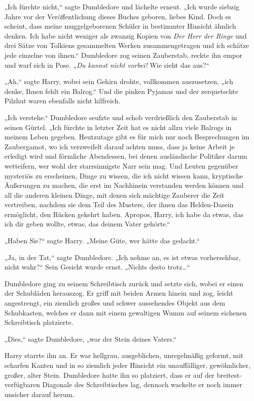 {„Ich fürchte nicht,“ sagte Dumbledore und lächelte erneut. „Ich wurde siebzig Jahre vor der Veröffentlichung dieses Buches geboren, liebes Kind. Doch es scheint, dass meine muggelgeborenen Schüler in bestimmter Hinsicht ähnlich denken. Ich habe nicht weniger als zwanzig Kopien von \emph{Der Herr der Ringe} und drei Sätze von Tolkiens gesammelten Werken zusammengetragen und ich schätze jede einzelne von ihnen.“ Dumbledore zog seinen Zauberstab, reckte ihn empor und warf sich in Pose. „\emph{Du kannst nicht vorbei!} Wie sieht das aus?“

„Ah,“ sagte Harry, wobei sein Gehirn drohte, vollkommen auszusetzen, „ich denke, Ihnen fehlt ein Balrog.“ Und die pinken Pyjamas und der zerquetschte Pilzhut waren ebenfalls nicht hilfreich.

„Ich verstehe.“ Dumbledore seufzte und schob verdrießlich den Zauberstab in seinen Gürtel. „Ich fürchte in letzter Zeit hat es nicht allzu viele Balrogs in meinem Leben gegeben. Heutzutage gibt es für mich nur noch Besprechungen im Zaubergamot, wo ich verzweifelt darauf achten muss, dass ja keine Arbeit je erledigt wird und förmliche Abendessen, bei denen ausländische Politiker darum wetteifern, wer wohl der starrsinnigste Narr sein mag. Und Leuten gegenüber mysteriös zu erscheinen, Dinge zu wissen, die ich nicht wissen kann, kryptische Äußerungen zu machen, die erst im Nachhinein verstanden werden können und all die anderen kleinen Dinge, mit denen sich mächtige Zauberer die Zeit vertreiben, nachdem sie dem Teil des Musters, der ihnen das Helden-Dasein ermöglicht, den Rücken gekehrt haben. Apropos, Harry, ich habe da etwas, das ich dir geben wollte, etwas, das deinem Vater gehörte.“

„Haben Sie?“ sagte Harry. „Meine Güte, wer hätte das gedacht.“

„Ja, in der Tat,“ sagte Dumbledore. „Ich nehme an, es ist etwas vorhersehbar, nicht wahr?“ Sein Gesicht wurde ernst. „Nichts desto trotz…“

Dumbledore ging zu seinem Schreibtisch zurück und setzte sich, wobei er einen der Schubläden herauszog. Er griff mit beiden Armen hinein und zog, leicht angestrengt, ein ziemlich großes und schwer aussehendes Objekt aus dem Schubkasten, welches er dann mit einem gewaltigen Wumm auf seinem eichenen Schreibtisch platzierte.

„Dies,“ sagte Dumbledore, „war der Stein deines Vaters.“

Harry starrte ihn an. Er war hellgrau, ausgeblichen, unregelmäßig geformt, mit scharfen Kanten und in so ziemlich jeder Hinsicht ein unauffälliger, gewöhnlicher, großer, alter Stein. Dumbledore hatte ihn so platziert, dass er auf der breitest-verfügbaren Diagonale des Schreibtisches lag, dennoch wackelte er noch immer unsicher darauf herum.

}
